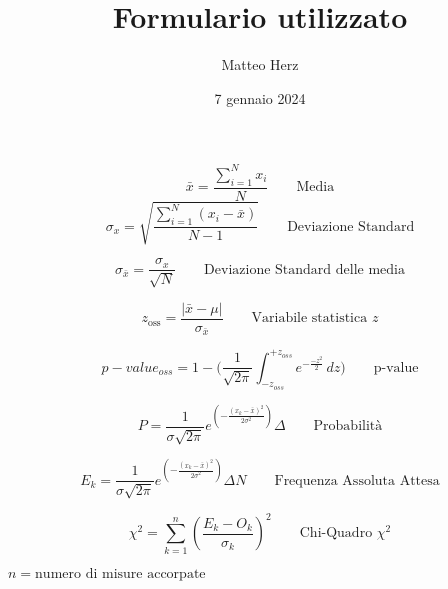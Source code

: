 \documentclass{article}
\title{\LARGE\textbf{Formulario utilizzato}}
\author{\Large Matteo Herz}
\date{7 gennaio 2024}
\begin{document}
	\maketitle
	
	\vspace{2.5cm}
	
	\[
	\bar{x} = \frac{\sum_{i=1}^{N}x_{i}}{N}  \quad\quad\text{Media}
	\]
	\[
	\sigma_x = \sqrt{\frac{\sum_{i=1}^{N}\left(x_{i} - \bar{x}\right)}{N-1}} \quad\quad\text{Deviazione Standard}
	\]
	
	\[
	\sigma_{\bar{x}} = \frac{\sigma_{x}}{\sqrt{N}} \quad\quad\text{Deviazione Standard delle media}
	\]
	
	\[ z_{\text{oss}} = \frac{| \bar{x} - \mu |}{\sigma_{\bar{x}}}\quad\quad\text{Variabile statistica $z$}  \] 
	
	\[
	p-value_{oss} = 1 - \bigg( \frac{1}{\sqrt{2\pi}} \int_{-z_{oss}}^{+ z_{oss}}e^{-\frac{-z^2}{2}} \,dz \bigg) \quad\quad\text{p-value}\]
	
	\[
	P=\frac{1}{\sigma\sqrt{2\pi}}e^{\left(-\frac{\left(x_{k}-\bar{x}\right)^2}{2\sigma^2}\right)}\Delta  \quad\quad\text{Probabilità} 
	\]
	
	\[
	E_{k} = \frac{1}{\sigma\sqrt{2\pi}}e^{\left(-\frac{\left(x_{k}-\bar{x}\right)^2}{2\sigma^2}\right)}\Delta N
	\quad\quad\text{Frequenza Assoluta Attesa}
	\]
	
	\vspace{0.4cm}
	
	\[
	\chi^2 = \sum_{k=1}^{n}\left(\frac{E_{k}-O_{k}}{\sigma_k}\right)^2\quad\quad\text{Chi-Quadro $\chi^2$}
	\]
	\begin{center}
		$n = \text{numero di misure accorpate}$
	\end{center}
	
	
\end{document}
